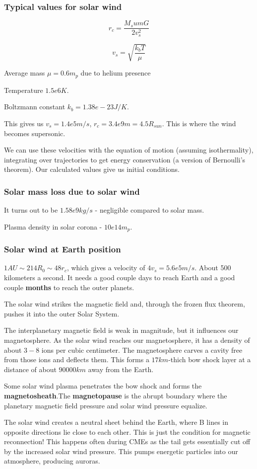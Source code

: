 \documentclass[PlasmaNotes.tex]{subfiles}
\begin{document}
\subsubsection{Typical values for solar wind}

\[ r_c = \frac{M_sum G}{2 v_s^2} \]

\[ v_s = \sqrt{\frac{k_b T}{\mu}} \]

Average mass $\mu = 0.6 m_p$ due to helium presence

Temperature $1.5e6 K$.

Boltzmann constant $k_b = 1.38e-23 J/K$.

This gives us $v_s = 1.4e5 m/s$, $r_c = 3.4e9 m = 4.5 R_{sun}$. This is where the wind becomes supersonic.

We can use these velocities with the equation of motion (assuming isothermality), integrating over trajectories to get energy conservation (a version of Bernoulli's theorem). Our calculated values give us initial conditions.

\subsubsection{Solar mass loss due to solar wind}

It turns out to be $1.58e9 kg/s$ - negligible compared to solar mass.

Plasma density in solar corona - $10e14 m_p$. 

\subsubsection{Solar wind at Earth position}

$1 AU \sim 214 R_0 \sim 48 r_c$, which gives a velocity of $4 v_s = 5.6e5 m/s$. About 500 kilometers a second. It needs a good couple days to reach Earth and a good couple \textbf{months} to reach the outer planets.

The solar wind strikes the magnetic field and, through the frozen flux theorem, pushes it into the outer Solar System.

The interplanetary magnetic field is weak in magnitude, but it influences our magnetosphere. As the solar wind reaches our magnetosphere, it has a density of about $3-8$ ions per cubic centimeter. The magnetosphere carves a cavity free from those ions and deflects them. This forms a $17 km$-thich bow shock layer at a distance of about $90000 km$ away from the Earth.

Some solar wind plasma penetrates the bow shock and forms the \textbf{magnetosheath}.The \textbf{magnetopause} is the abrupt boundary where the planetary magnetic field pressure and solar wind pressure equalize.

The solar wind creates a neutral sheet behind the Earth, where B lines in opposite directions lie close to each other. This is just the condition for magnetic reconnection! This happens often during CMEs as the tail gets essentially cut off by the increased solar wind pressure. This pumps energetic particles into our atmosphere, producing auroras.
\end{document}
